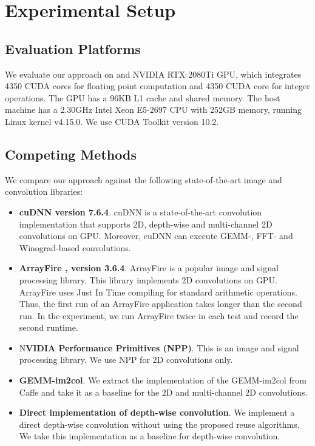 

\section{Experimental Setup}

\subsection{Evaluation Platforms} We evaluate our approach on and NVIDIA RTX 2080Ti GPU, which integrates 4350 CUDA cores for floating
point computation  and 4350 CUDA core for integer operations. The GPU has a 96KB L1 cache and shared memory. The host machine has a 2.30GHz
Intel Xeon E5-2697 CPU with 252GB memory, running Linux kernel v4.15.0. We use CUDA Toolkit version 10.2.


\subsection{Competing Methods} We compare our approach against the following state-of-the-art image and convolution libraries:
\begin{itemize}
  \item \textbf{cuDNN version 7.6.4}. cuDNN is a state-of-the-art convolution implementation that supports 2D, depth-wise and multi-channel 2D convolutions
      on GPU. Moreover, cuDNN can execute GEMM-, FFT- and Winograd-based convolutions.
  \item \textbf{ArrayFire \cite{Yalamanchili2015}, version 3.6.4}. ArrayFire is a popular image and signal processing library. This
      library implements 2D convolutions on GPU. ArrayFire uses Just In Time compiling for standard arithmetic operations. Thus, the
      first run of an ArrayFire application takes longer than the second run. In the experiment, we run ArrayFire twice in each test and
      record the second runtime.
  \item N\textbf{VIDIA Performance Primitives (NPP)}. This is an image and signal processing library. We use NPP for 2D convolutions
      only.
  \item \textbf{GEMM-im2col}. We extract the implementation of the GEMM-im2col from Caffe \cite{jia2014caffe} and take it as a baseline
      for the 2D and multi-channel 2D convolutions.
  \item \textbf{Direct implementation of depth-wise convolution}. We implement a direct depth-wise convolution without using the proposed reuse algorithms. We take this implementation as a baseline for depth-wise convolution.

\end{itemize}

